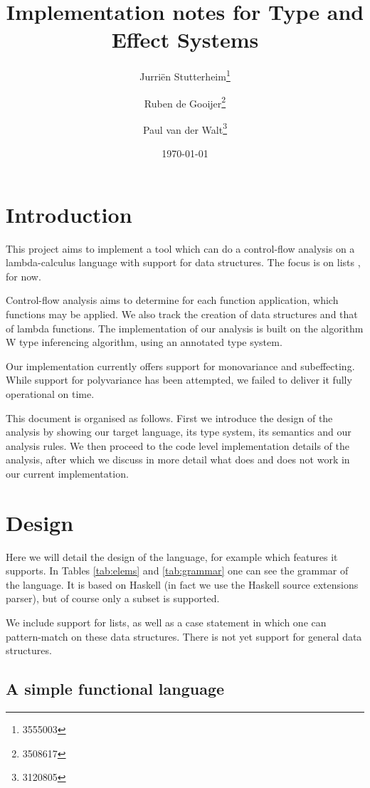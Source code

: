 \documentclass[a4paper]{article}
\author{Jurri\"en Stutterheim\footnote{3555003}\and Ruben de Gooijer\footnote{3508617}\and Paul van der Walt\footnote{3120805}}
\date{\today}
\title{Implementation notes for Type and Effect Systems}
\begin{document}
\maketitle \tableofcontents

\section{Introduction}

This project aims to implement a tool which can do a control-flow analysis on a
lambda-calculus language with support for data structures. The focus is on
 lists%
, for now.

Control-flow analysis aims to determine for each function application, which
functions may be applied. We also track the creation of data structures and that
of lambda functions. The implementation of our analysis is built on the
algorithm W type inferencing algorithm, using an annotated type system.

Our implementation currently offers support for monovariance and subeffecting.
While support for polyvariance has been attempted, we failed to deliver it fully
operational on time.

This document is organised as follows. First we introduce the design of the
analysis by showing our target language, its type system, its semantics and
our analysis rules. We then proceed to the code level implementation details of
the analysis, after which we discuss in more detail what does and does not work
in our current implementation.

\section{Design}

Here we will detail the design of the language, for example which features it
supports. In Tables \ref{tab:elems} and \ref{tab:grammar} one can see the
grammar of the language. It is based on Haskell (in fact we use the Haskell
source extensions parser), but of course only a subset is supported. 

We include support for %
 lists, as well as a case statement in which one
can pattern-match on these data structures. There is not yet support for general
data structures.

\subsection{A simple functional language}
\end{document}
